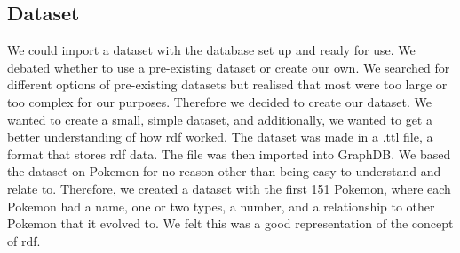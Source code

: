 \subsection{Dataset}\label{sec:dataset}
We could import a dataset with the database set up and ready for use. We debated whether to use a pre-existing dataset or create our own. We searched for different options of pre-existing datasets but realised that most were too large or too complex for our purposes. Therefore we decided to create our dataset. We wanted to create a small, simple dataset, and additionally, we wanted to get a better understanding of how \gls{rdf} worked. The dataset was made in a .ttl file, a format that stores \gls{rdf} data. The file was then imported into GraphDB.
We based the dataset on Pokemon for no reason other than being easy to understand and relate to. Therefore, we created a dataset with the first 151 Pokemon, where each Pokemon had a name, one or two types, a number, and a relationship to other Pokemon that it evolved to. We felt this was a good representation of the concept of \gls{rdf}.